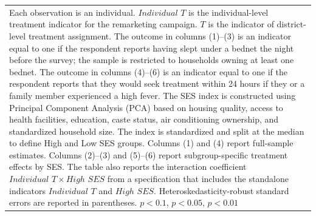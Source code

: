 {{\begin{tabular}{l*{6}{c}}
\hline\hline
\multicolumn{7}{p{0.95\linewidth}}{\scriptsize Each observation is an individual. \(Individual\,\,T\) is the individual-level treatment indicator for the remarketing campaign. \(T\) is the indicator of district-level treatment assignment. The outcome in columns (1)--(3) is an indicator equal to one if the respondent reports having slept under a bednet the night before the survey; the sample is restricted to households owning at least one bednet. The outcome in columns (4)--(6) is an indicator equal to one if the respondent reports that they would seek treatment within 24 hours if they or a family member experienced a high fever. The SES index is constructed using Principal Component Analysis (PCA) based on housing quality, access to health facilities, education, caste status, air conditioning ownership, and standardized household size. The index is standardized and split at the median to define High and Low SES groups. Columns (1) and (4) report full-sample estimates. Columns (2)--(3) and (5)--(6) report subgroup-specific treatment effects by SES. The table also reports the interaction coefficient \(Individual\,\,T \times High\,\,SES\) from a specification that includes the standalone indicators \(Individual\,\,T\) and \(High\,\,SES\).  Heteroskedasticity-robust standard errors are reported in parentheses. \sym{*} \(p<0.1\), \sym{**} \(p<0.05\), \sym{***} \(p<0.01\)}\\
\end{tabular}
}%

}
